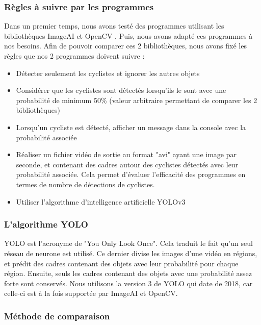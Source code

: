 \subsubsection{Règles à suivre par les programmes}
\label{sec:comparaisonIA:methode_recherche:regles}
Dans un premier temps, nous avons testé des programmes utilisant les bibliothèques ImageAI et OpenCV \cite{ImageAI_programme, OpenCV_programme}.
Puis, nous avons adapté ces programmes à nos besoins.
Afin de pouvoir comparer ces 2 bibliothèques, nous avons fixé les règles que nos 2 programmes doivent suivre :

\begin{itemize}
    \item Détecter seulement les cyclistes et ignorer les autres objets
    \item Considérer que les cyclistes sont détectés lorsqu'ils le sont avec une probabilité de minimum 50\% (valeur arbitraire permettant de comparer les 2 bibliothèques)
    \item Lorsqu'un cycliste est détecté, afficher un message dans la console avec la probabilité associée
    \item Réaliser un fichier vidéo de sortie au format "avi" ayant une image par seconde, et contenant des cadres autour des cyclistes détectés avec leur probabilité associée. 
    Cela permet d'évaluer l'efficacité des programmes en termes de nombre de détections de cyclistes.
    \item Utiliser l'algorithme d'intelligence artificielle YOLOv3
\end{itemize}

\subsubsection{L'algorithme YOLO}
\label{sec:comparaisonIA:methode_recherche:yolo}

YOLO est l'acronyme de "You Only Look Once". Cela traduit le fait qu'un seul réseau de neurone est utilisé. \cite{Yolov3}
Ce dernier divise les images d'une vidéo en régions, et prédit des cadres contenant des objets avec leur probabilité pour chaque région.
Ensuite, seuls les cadres contenant des objets avec une probabilité assez forte sont conservés.
Nous utilisons la version 3 de YOLO qui date de 2018, car celle-ci est à la fois supportée par ImageAI et OpenCV.

\subsubsection{Méthode de comparaison}
\label{sec:comparaisonIA:methode_recherche:methode_comparaison}

